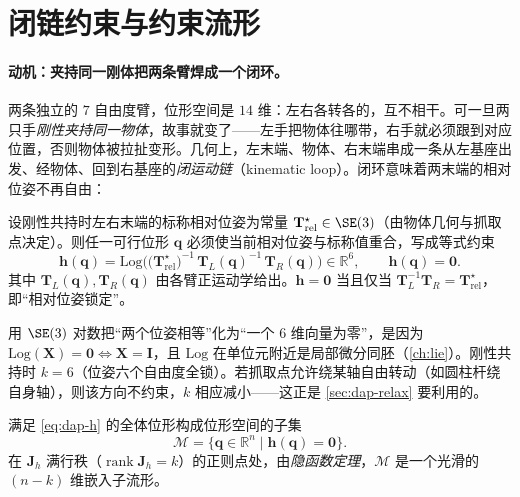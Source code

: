 \section{闭链约束与约束流形}
\label{sec:dap-closedchain}

\paragraph{动机：夹持同一刚体把两条臂焊成一个闭环。}
两条独立的 $7$ 自由度臂，位形空间是 $14$ 维：左右各转各的，互不相干。可一旦两只手\emph{刚性夹持同一物体}，故事就变了——左手把物体往哪带，右手就必须跟到对应位置，否则物体被拉扯变形。几何上，左末端、物体、右末端串成一条从左基座出发、经物体、回到右基座的\emph{闭运动链}（kinematic loop）。闭环意味着两末端的相对位姿不再自由：

\begin{definition}[双臂闭链约束]\label{def:dap-closedchain}
设刚性共持时左右末端的标称相对位姿为常量 $\mathbf{T}_{\text{rel}}^{\star}\in\SE(3)$（由物体几何与抓取点决定）。则任一可行位形 $\mathbf{q}$ 必须使当前相对位姿与标称值重合，写成等式约束
\begin{equation}
  \mathbf{h}(\mathbf{q})=\mathrm{Log}\!\Big(\big(\mathbf{T}_{\text{rel}}^{\star}\big)^{-1}\,\mathbf{T}_L(\mathbf{q})^{-1}\,\mathbf{T}_R(\mathbf{q})\Big)\in\mathbb{R}^6,\qquad \mathbf{h}(\mathbf{q})=\mathbf{0}.
  \label{eq:dap-h}
\end{equation}
其中 $\mathbf{T}_L(\mathbf{q}),\mathbf{T}_R(\mathbf{q})$ 由各臂正运动学给出。$\mathbf{h}=\mathbf{0}$ 当且仅当 $\mathbf{T}_L^{-1}\mathbf{T}_R=\mathbf{T}_{\text{rel}}^{\star}$，即“相对位姿锁定”。
\end{definition}

用 $\SE(3)$ 对数把“两个位姿相等”化为“一个 $6$ 维向量为零”，是因为 $\mathrm{Log}(\mathbf{X})=\mathbf{0}\iff\mathbf{X}=\mathbf{I}$，且 $\mathrm{Log}$ 在单位元附近是局部微分同胚（\cref{ch:lie}）。刚性共持时 $k=6$（位姿六个自由度全锁）。若抓取点允许绕某轴自由转动（如圆柱杆绕自身轴），则该方向不约束，$k$ 相应减小——这正是 \cref{sec:dap-relax} 要利用的。

\begin{definition}[约束流形]\label{def:dap-manifold}
满足 \cref{eq:dap-h} 的全体位形构成位形空间的子集
\begin{equation}
  \mathcal{M}=\{\mathbf{q}\in\mathbb{R}^{n}\mid \mathbf{h}(\mathbf{q})=\mathbf{0}\}.
  \label{eq:dap-manifold}
\end{equation}
在 $\mathbf{J}_h$ 满行秩（$\operatorname{rank}\mathbf{J}_h=k$）的正则点处，由\emph{隐函数定理}，$\mathcal{M}$ 是一个光滑的 $(n-k)$ 维嵌入子流形。
\end{definition}

